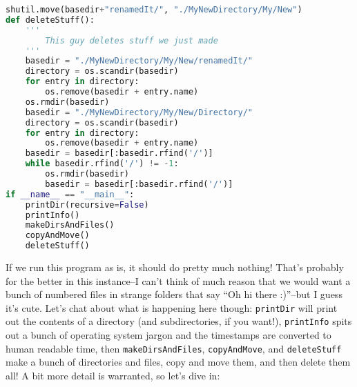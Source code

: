 \documentclass[12pt]{article}
\begin{document}
\begin{lstlisting}[language=Python]
    shutil.move(basedir+"renamedIt/", "./MyNewDirectory/My/New")
def deleteStuff():
    '''
        This guy deletes stuff we just made
    '''
    basedir = "./MyNewDirectory/My/New/renamedIt/"
    directory = os.scandir(basedir)
    for entry in directory:
        os.remove(basedir + entry.name)
    os.rmdir(basedir)
    basedir = "./MyNewDirectory/My/New/Directory/"
    directory = os.scandir(basedir)
    for entry in directory:
        os.remove(basedir + entry.name)
    basedir = basedir[:basedir.rfind('/')]
    while basedir.rfind('/') != -1:
        os.rmdir(basedir)
        basedir = basedir[:basedir.rfind('/')]
if __name__ == "__main__":
    printDir(recursive=False)
    printInfo()
    makeDirsAndFiles()
    copyAndMove()
    deleteStuff()
\end{lstlisting}
If we run this program as is, it should do pretty much nothing! That's probably for the better in this instance--I can't think of much reason that we would want a bunch of numbered files in strange folders that say ``Oh hi there :)''--but I guess it's cute. Let's chat about what is happening here though: \texttt{printDir} will print out the contents of a directory (and subdirectories, if you want!), \texttt{printInfo} spits out a bunch of operating system jargon and the timestamps are converted to human readable time, then \texttt{makeDirsAndFiles}, \texttt{copyAndMove}, and \texttt{deleteStuff} make a bunch of directories and files, copy and move them, and then delete them all! A bit more detail is warranted, so let's dive in:\\
\end{document}
